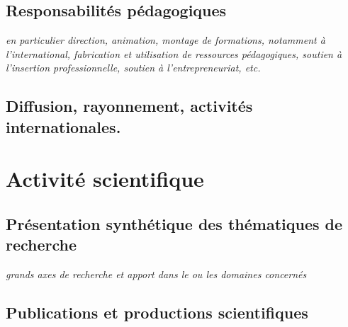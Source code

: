 \documentclass[a4paper,12pt]{article}
\newcommand{\ligneSeparatrice}{\noindent{\color{black!40}\rule{\textwidth}{2pt}}}
\newcommand{\instructions}[1]{{\color{black}#1}}
\begin{document}
\subsection{Responsabilités pédagogiques}

\instructions{%
	{\em
	en particulier direction, animation, montage de formations, notamment à l’international, fabrication et utilisation de ressources pédagogiques, soutien à l'insertion professionnelle, soutien à l'entrepreneuriat, etc.
	}
}


\subsection{Diffusion, rayonnement, activités internationales.}


\ligneSeparatrice{}


\section{Activité scientifique}

\subsection{Présentation synthétique des thématiques de recherche}


\instructions{%
	{\em
	grands axes de recherche et apport dans le ou les domaines concernés
	}
}


\subsection{Publications et productions scientifiques }
\end{document}
